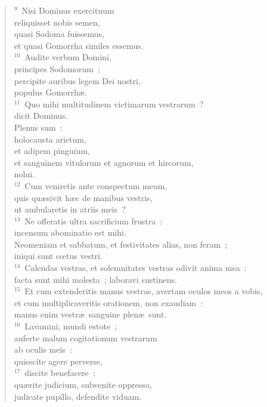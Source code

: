 \begin{flushleft}
\begin{verse}
${}^{9}$~Nisi Dominus exercituum\\ reliquisset nobis semen,\\ quasi Sodoma fuissemus,\\ et quasi Gomorrha similes essemus.\\
${}^{10}$~Audite verbum Domini,\\ principes Sodomorum~;\\ percipite auribus legem Dei nostri,\\ populus Gomorrh\ae .\\
${}^{11}$~Quo mihi multitudinem victimarum vestrarum~?\\ dicit Dominus.\\ Plenus sum~:\\ holocausta arietum,\\ et adipem pinguium,\\ et sanguinem vitulorum et agnorum et hircorum,\\ nolui.\\
${}^{12}$~Cum veniretis ante conspectum meum,\\ quis qu\ae sivit h\ae c de manibus vestris,\\ ut ambularetis in atriis meis~?\\
${}^{13}$~Ne offeratis ultra sacrificium frustra~:\\ incensum abominatio est mihi.\\ Neomeniam et sabbatum, et festivitates alias, non feram~;\\ iniqui sunt cœtus vestri.\\
${}^{14}$~Calendas vestras, et solemnitates vestras odivit anima mea~:\\ facta sunt mihi molesta~; laboravi sustinens.\\
${}^{15}$~Et cum extenderitis manus vestras, avertam oculos meos a vobis,\\ et cum multiplicaveritis orationem, non exaudiam~:\\ manus enim vestr\ae\ sanguine plen\ae\ sunt.\\
${}^{16}$~Lavamini, mundi estote~;\\ auferte malum cogitationum vestrarum\\ ab oculis meis~:\\ quiescite agere perverse,\\
${}^{17}$~discite benefacere~;\\ qu\ae rite judicium, subvenite oppresso,\\ judicate pupillo, defendite viduam.\end{verse}\end{flushleft}


